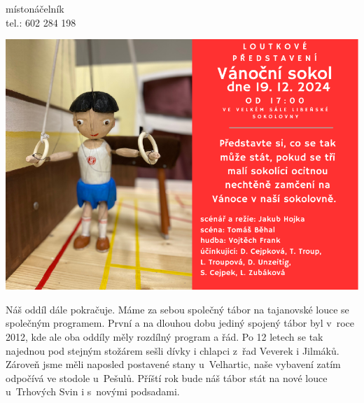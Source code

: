 \documentclass[11pt]{article}
\begin{document}
\signature{Jiří Novák (Jirkan)}{místonáčelník\\tel.: 602 284 198}

\vspace*{24pt}

\begin{center}
  \includegraphics[width=\linewidth]{./Vanocni_Sokol_sal_2024.pdf}
\end{center}

\vspace*{24pt}

Náš oddíl dále pokračuje. Máme za sebou společný tábor na tajanovské louce se společným programem. První a na dlouhou dobu jediný spojený tábor byl v~roce 2012, kde ale oba oddíly měly rozdílný program a řád. Po 12 letech se tak najednou pod stejným stožárem sešli dívky i chlapci z~řad Veverek i Jilmáků. Zároveň jsme měli naposled postavené stany u~Velhartic, naše vybavení zatím odpočívá ve stodole u~Pešulů. Příští rok bude náš tábor stát na nové louce u~Trhových Svin i s~novými podsadami.
\end{document}
